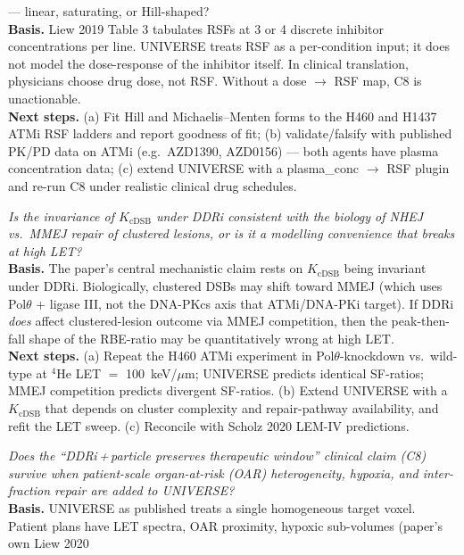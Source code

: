 \documentclass[11pt]{article}
\begin{document}
\begin{description}
{        --- linear, saturating, or Hill-shaped?}\\
        \textbf{Basis.} Liew 2019 Table 3 tabulates RSFs at 3 or 4 discrete inhibitor
        concentrations per line. UNIVERSE treats RSF as a per-condition input; it does not model
        the dose-response of the inhibitor itself. In clinical translation, physicians choose
        drug dose, not RSF. Without a dose $\to$ RSF map, C8 is unactionable.\\
        \textbf{Next steps.} (a) Fit Hill and Michaelis--Menten forms to the H460 and H1437 ATMi
        RSF ladders and report goodness of fit; (b) validate/falsify with published PK/PD data on
        ATMi (e.g.\ AZD1390, AZD0156) --- both agents have plasma concentration data; (c) extend
        UNIVERSE with a plasma\_conc $\to$ RSF plugin and re-run C8 under realistic clinical
        drug schedules.
  \item[Q4.] \emph{Is the invariance of $K_{\mathrm{cDSB}}$ under DDRi consistent with the
        biology of NHEJ vs.\ MMEJ repair of clustered lesions, or is it a modelling convenience
        that breaks at high LET?}\\
        \textbf{Basis.} The paper's central mechanistic claim rests on $K_{\mathrm{cDSB}}$ being
        invariant under DDRi. Biologically, clustered DSBs may shift toward MMEJ (which uses
        Pol$\theta$ + ligase III, not the DNA-PKcs axis that ATMi/DNA-PKi target). If DDRi
        \emph{does} affect clustered-lesion outcome via MMEJ competition, then the peak-then-fall
        shape of the RBE-ratio may be quantitatively wrong at high LET.\\
        \textbf{Next steps.} (a) Repeat the H460 ATMi experiment in Pol$\theta$-knockdown vs.\
        wild-type at $^{4}$He LET $=$ 100~keV/$\mu$m; UNIVERSE predicts identical SF-ratios; MMEJ
        competition predicts divergent SF-ratios. (b) Extend UNIVERSE with a $K_{\mathrm{cDSB}}$
        that depends on cluster complexity and repair-pathway availability, and refit the LET
        sweep. (c) Reconcile with Scholz 2020 LEM-IV predictions.
  \item[Q5.] \emph{Does the ``DDRi\,+\,particle preserves therapeutic window'' clinical claim (C8)
        survive when patient-scale organ-at-risk (OAR) heterogeneity, hypoxia, and inter-fraction
        repair are added to UNIVERSE?}\\
        \textbf{Basis.} UNIVERSE as published treats a single homogeneous target voxel. Patient
        plans have LET spectra, OAR proximity, hypoxic sub-volumes (paper's own Liew 2020

\end{description}
\end{document}
